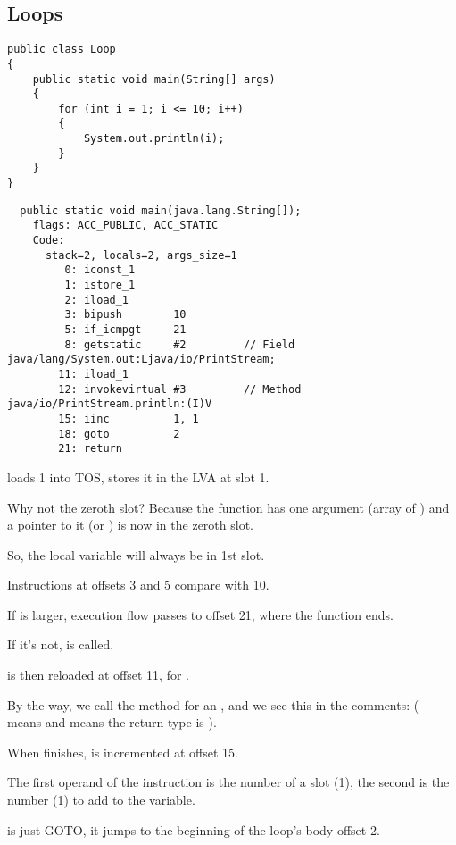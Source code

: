 \subsection{Loops}

\begin{lstlisting}[style=customjava]
public class Loop
{
	public static void main(String[] args)
	{ 
		for (int i = 1; i <= 10; i++)
		{
			System.out.println(i); 
		}               
	}
}
\end{lstlisting}

\begin{lstlisting}
  public static void main(java.lang.String[]);
    flags: ACC_PUBLIC, ACC_STATIC
    Code:
      stack=2, locals=2, args_size=1
         0: iconst_1      
         1: istore_1      
         2: iload_1       
         3: bipush        10
         5: if_icmpgt     21
         8: getstatic     #2         // Field java/lang/System.out:Ljava/io/PrintStream;
        11: iload_1       
        12: invokevirtual #3         // Method java/io/PrintStream.println:(I)V
        15: iinc          1, 1
        18: goto          2
        21: return        
\end{lstlisting}

 loads 1 into \ac{TOS},  stores it in the \ac{LVA} at slot 1.

Why not the zeroth slot?
Because the \main function has one argument (array of ) 
and a pointer to it (or ) is now in the zeroth slot.


So, the  local variable will always be in 1st slot.


Instructions at offsets 3 and 5 compare  with 10.

If  is larger, execution flow passes to offset 21, where the function ends.

If it's not,  is called.

 is then reloaded at offset 11, for .

By the way, we call the  method for an , 
and we see this in the comments: 
( means  and  means the return type is ).


When  finishes,  is incremented at offset 15.

The first operand of the instruction is the  number of a slot (1), 
the second is the number (1) to add to the variable.


 is just GOTO, it jumps to the beginning of the loop's body offset 2.


